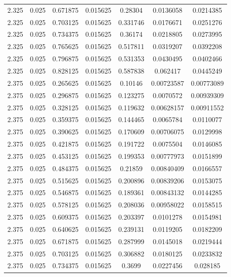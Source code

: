 \begin{table}[bh]
\begin{center}
{\begin{tabular}{ccccccc}
2.325	 & 0.025 & 	0.671875	 & 0.015625	 & 0.28304	 & 0.0136058	 & 0.0214385 \\ 
2.325	 & 0.025 & 	0.703125	 & 0.015625	 & 0.331746	 & 0.0176671	 & 0.0251276 \\ 
2.325	 & 0.025 & 	0.734375	 & 0.015625	 & 0.36174	 & 0.0218805	 & 0.0273995 \\ 
2.325	 & 0.025 & 	0.765625	 & 0.015625	 & 0.517811	 & 0.0319207	 & 0.0392208 \\ 
2.325	 & 0.025 & 	0.796875	 & 0.015625	 & 0.531353	 & 0.0430495	 & 0.0402466 \\ 
2.325	 & 0.025 & 	0.828125	 & 0.015625	 & 0.587838	 & 0.062417	 & 0.0445249 \\ 
2.375	 & 0.025 & 	0.265625	 & 0.015625	 & 0.10146	 & 0.00723587	 & 0.00773089 \\ 
2.375	 & 0.025 & 	0.296875	 & 0.015625	 & 0.123275	 & 0.0070572	 & 0.00939309 \\ 
2.375	 & 0.025 & 	0.328125	 & 0.015625	 & 0.119632	 & 0.00628157	 & 0.00911552 \\ 
2.375	 & 0.025 & 	0.359375	 & 0.015625	 & 0.144465	 & 0.0065784	 & 0.0110077 \\ 
2.375	 & 0.025 & 	0.390625	 & 0.015625	 & 0.170609	 & 0.00706075	 & 0.0129998 \\ 
2.375	 & 0.025 & 	0.421875	 & 0.015625	 & 0.191722	 & 0.0075504	 & 0.0146085 \\ 
2.375	 & 0.025 & 	0.453125	 & 0.015625	 & 0.199353	 & 0.00777973	 & 0.0151899 \\ 
2.375	 & 0.025 & 	0.484375	 & 0.015625	 & 0.21859	 & 0.00840409	 & 0.0166557 \\ 
2.375	 & 0.025 & 	0.515625	 & 0.015625	 & 0.200896	 & 0.00839206	 & 0.0153075 \\ 
2.375	 & 0.025 & 	0.546875	 & 0.015625	 & 0.189361	 & 0.00843132	 & 0.0144285 \\ 
2.375	 & 0.025 & 	0.578125	 & 0.015625	 & 0.208036	 & 0.00958022	 & 0.0158515 \\ 
2.375	 & 0.025 & 	0.609375	 & 0.015625	 & 0.203397	 & 0.0101278	 & 0.0154981 \\ 
2.375	 & 0.025 & 	0.640625	 & 0.015625	 & 0.239131	 & 0.0119205	 & 0.0182209 \\ 
2.375	 & 0.025 & 	0.671875	 & 0.015625	 & 0.287999	 & 0.0145018	 & 0.0219444 \\ 
2.375	 & 0.025 & 	0.703125	 & 0.015625	 & 0.306882	 & 0.0180125	 & 0.0233832 \\ 
2.375	 & 0.025 & 	0.734375	 & 0.015625	 & 0.3699	 & 0.0227456	 & 0.028185 \\ 

\end{tabular}}
\end{center}
\end{table}

